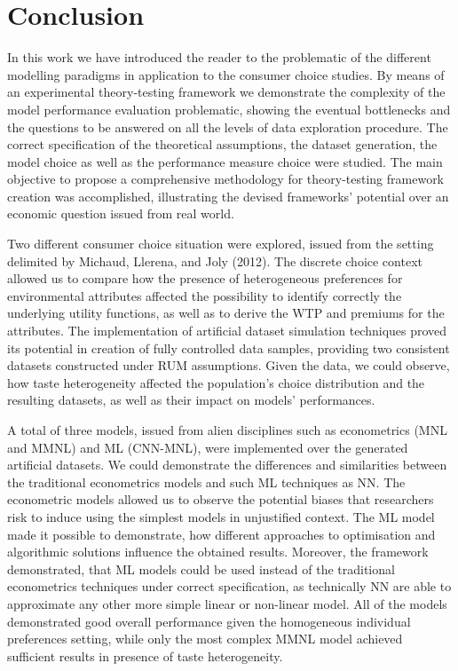\documentclass[11pt,]{article}
\title{}
\author{}
\date{}
\begin{document}
\FloatBarrier

\newpage

\hypertarget{conclusion}{%
\section*{Conclusion}\label{conclusion}}

In this work we have introduced the reader to the problematic of the
different modelling paradigms in application to the consumer choice
studies. By means of an experimental theory-testing framework we
demonstrate the complexity of the model performance evaluation
problematic, showing the eventual bottlenecks and the questions to be
answered on all the levels of data exploration procedure. The correct
specification of the theoretical assumptions, the dataset generation,
the model choice as well as the performance measure choice were studied.
The main objective to propose a comprehensive methodology for
theory-testing framework creation was accomplished, illustrating the
devised frameworks' potential over an economic question issued from real
world.

Two different consumer choice situation were explored, issued from the
setting delimited by Michaud, Llerena, and Joly (2012). The discrete
choice context allowed us to compare how the presence of heterogeneous
preferences for environmental attributes affected the possibility to
identify correctly the underlying utility functions, as well as to
derive the WTP and premiums for the attributes. The implementation of
artificial dataset simulation techniques proved its potential in
creation of fully controlled data samples, providing two consistent
datasets constructed under RUM assumptions. Given the data, we could
observe, how taste heterogeneity affected the population's choice
distribution and the resulting datasets, as well as their impact on
models' performances.

A total of three models, issued from alien disciplines such as
econometrics (MNL and MMNL) and ML (CNN-MNL), were implemented over the
generated artificial datasets. We could demonstrate the differences and
similarities between the traditional econometrics models and such ML
techniques as NN. The econometric models allowed us to observe the
potential biases that researchers risk to induce using the simplest
models in unjustified context. The ML model made it possible to
demonstrate, how different approaches to optimisation and algorithmic
solutions influence the obtained results. Moreover, the framework
demonstrated, that ML models could be used instead of the traditional
econometrics techniques under correct specification, as technically NN
are able to approximate any other more simple linear or non-linear
model. All of the models demonstrated good overall performance given the
homogeneous individual preferences setting, while only the most complex
MMNL model achieved sufficient results in presence of taste
heterogeneity.
\end{document}
